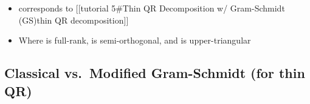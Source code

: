 \begin{itemize}
  \begin{itemize}
  
  \item
    corresponds to {[}{[}tutorial 5\#Thin QR Decomposition w/
    Gram-Schmidt (GS)\textbar thin QR decomposition{]}{]}
  \item
    Where  is full-rank,
     is
    semi-orthogonal, and  is
    upper-triangular
  \end{itemize}
\end{itemize}

\subsection*{Classical vs.~Modified Gram-Schmidt (for thin
QR)}

